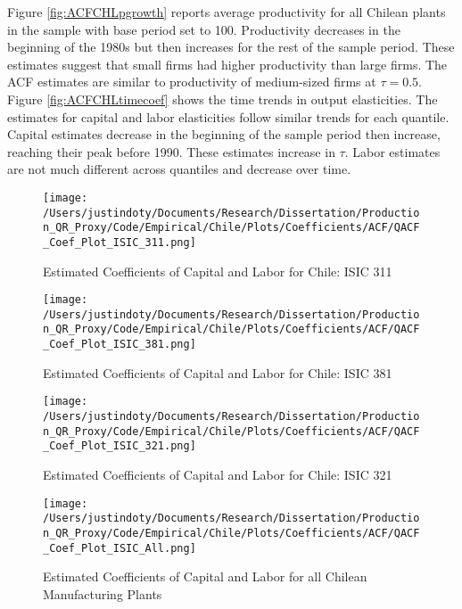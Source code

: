 \documentclass[11pt]{article}
\begin{document}
Figure \ref{fig:ACFCHLpgrowth} reports average productivity for all Chilean plants in the sample with base period set to 100. Productivity decreases in the beginning of the 1980s but then increases for the rest of the sample period. These estimates suggest that small firms had higher productivity than large firms. The ACF estimates are similar to productivity of medium-sized firms at $\tau=0.5$. Figure \ref{fig:ACFCHLtimecoef} shows the time trends in output elasticities. The estimates for capital and labor elasticities follow similar trends for each quantile. Capital estimates decrease in the beginning of the sample period then increase, reaching their peak before 1990. These estimates increase in $\tau$. Labor estimates are not much different across quantiles and decrease over time.

\begin{figure}[H]
\centering
\caption{Estimated Coefficients of Capital and Labor for Chile: ISIC 311}
\texttt{[image: /Users/justindoty/Documents/Research/Dissertation/Production\_QR\_Proxy/Code/Empirical/Chile/Plots/Coefficients/ACF/QACF\_Coef\_Plot\_ISIC\_311.png]}
\label{fig:ACFCHL311}
\end{figure}

\begin{figure}[H]
\centering
\caption{Estimated Coefficients of Capital and Labor for Chile: ISIC 381}
\texttt{[image: /Users/justindoty/Documents/Research/Dissertation/Production\_QR\_Proxy/Code/Empirical/Chile/Plots/Coefficients/ACF/QACF\_Coef\_Plot\_ISIC\_381.png]}
\label{fig:ACFCHL381}
\end{figure}

\begin{figure}[H]
\centering
\caption{Estimated Coefficients of Capital and Labor for Chile: ISIC 321}
\texttt{[image: /Users/justindoty/Documents/Research/Dissertation/Production\_QR\_Proxy/Code/Empirical/Chile/Plots/Coefficients/ACF/QACF\_Coef\_Plot\_ISIC\_321.png]}
\label{fig:ACFCHL321}
\end{figure}

\begin{figure}[H]
\centering
\caption{Estimated Coefficients of Capital and Labor for all Chilean Manufacturing Plants}
\texttt{[image: /Users/justindoty/Documents/Research/Dissertation/Production\_QR\_Proxy/Code/Empirical/Chile/Plots/Coefficients/ACF/QACF\_Coef\_Plot\_ISIC\_All.png]}
\label{fig:ACFCHLall}
\end{figure}
\end{document}
